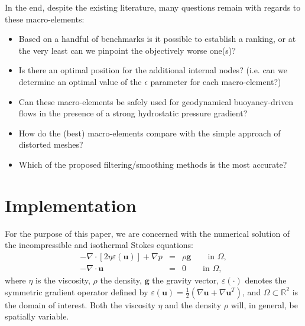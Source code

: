 \documentclass[a4paper,12pt]{article}
\begin{document}
In the end, despite the existing literature, many questions remain with regards to these macro-elements:
\begin{itemize}
\item Based on a handful of benchmarks is it possible to establish a ranking, 
or at the very least can we pinpoint the objectively worse one(s)?

\item Is there an optimal position for the additional internal nodes? (i.e. can we 
determine an optimal value of the 
$\epsilon$ parameter for each macro-element?)

\item Can these macro-elements be safely used for geodynamical 
buoyancy-driven flows in the presence of a strong hydrostatic pressure gradient?

\item How do the (best) macro-elements compare with the simple approach of 
distorted meshes?

\item Which of the proposed filtering/smoothing methods is the most accurate?
\end{itemize}











\section{Implementation}


For the purpose of this paper, we are concerned with the numerical solution of 
the incompressible and isothermal Stokes equations:
\begin{eqnarray}
-\nabla \cdot \left[ 2\eta \varepsilon({\bm u}) \right] + \nabla p &=& \rho \bm g \qquad  \textrm{in $\Omega$},
\label{eq:conv_momentum}  \\  
-\nabla \cdot {\bm u} &=& 0    \qquad    \textrm{in $\Omega$},   \label{eq:conv_mass} 
\end{eqnarray}
where $\eta$ is the viscosity, $\rho$ the density, ${\bm g}$ the gravity vector, $\varepsilon(\cdot)$
denotes the symmetric gradient operator defined by $\varepsilon({\bm u})
=\frac 12 (\nabla {\bm u} + \nabla {\bm u}^{T})$, 
and $\Omega\subset{\mathbb R}^2$ is the domain
of interest. Both the viscosity $\eta$
and the density $\rho$ will, in general, be spatially variable.
\end{document}
